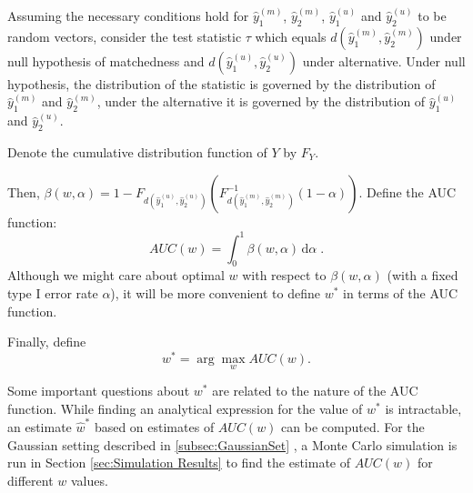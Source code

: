 \documentclass[12pt]{article} %
\begin{document}
 Assuming the necessary conditions hold for $\hat{y}_{1}^{(m)}\!$, $\hat{y}_{2}^{(m)}\!$, $\hat{y}_{1}^{(u)}\!$ and $\hat{y}_{2}^{(u)}$ to be random vectors, consider the test statistic $\tau$ which equals $d(\hat{y}_{1}^{(m)},\hat{y}_{2}^{(m)})$ under null hypothesis of matchedness and $d(\hat{y}_{1}^{(u)},\hat{y}_{2}^{(u)})$ under alternative. Under null hypothesis, the distribution of the statistic is governed by the distribution of $\hat{y}_{1}^{(m)}$ and $\hat{y}_{2}^{(m)}$, under the alternative it is governed by  the distribution of $\hat{y}_{1}^{(u)}$ and $\hat{y}_{2}^{(u)}$.

Denote  the   cumulative distribution function of  $Y$ by $F_Y$.

 Then, $\beta\left( w,\alpha\right)=1-F_{d \left(\hat{y}_{1}^{(u)},\hat{y}_{2}^{(u)}\right)}(F_{d\left(\hat{y}_{1}^{(m)},\hat{y}_{2}^{(m)}\right)}^{-1}(1-\alpha)).$
Define the AUC function:  $$AUC(w)=\int_{0}^{1}\! \beta\left( w,\alpha\right)\,\mathrm{d}\alpha \; .$$
Although we might care about optimal $w$ with respect to  $\beta\left( w,\alpha\right)$ (with a fixed type I error rate $\alpha$),  it will be more convenient to define $w^*$ in terms of the AUC function.

 Finally, define $$w^{*}=\arg\max_w{AUC\left( w\right)}. $$

 Some important questions about $w^*$ are  related to the nature of the AUC function.
While finding an analytical expression for the value of $w^*$ is intractable, an estimate $\hat{w}^*$  based on  estimates of $AUC(w)$ %
 can be computed.  For the Gaussian setting described in \ref{subsec:GaussianSet} , a Monte Carlo simulation is run in  Section  \ref{sec:Simulation Results} to find the estimate of $AUC(w)$ for different $w$ values.
\end{document}
